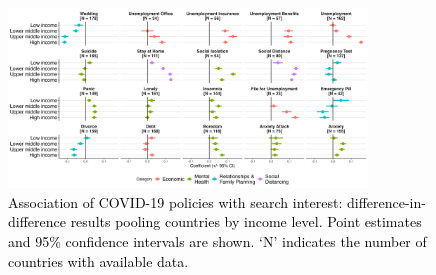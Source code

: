 \documentclass{article}
\begin{document}
\begin{figure}[H]
    \centering
    \includegraphics[width=0.85\textwidth]{figures/did_income_180.png}
    \caption{\textcolor{black}{Association of COVID-19 policies with search interest: difference-in-difference results pooling countries by income level. Point estimates and 95\% confidence intervals are shown. `N' indicates the number of countries with available data.}}
    \label{fig:did_income_180}
\end{figure}

\newpage


\end{document}
